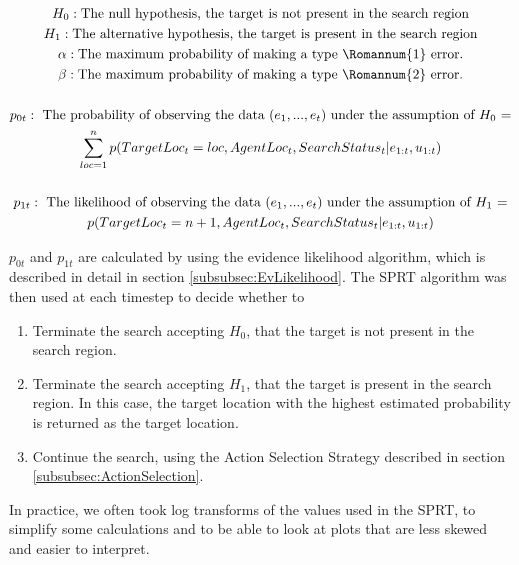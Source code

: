 \begin{gather}\label{eqn:SearchStatus}
H_0 : \text{The null hypothesis, the target is not present in the search region}\nonumber
\\ \nonumber
H_1 : \text{The alternative hypothesis, the target is present in the search region}\nonumber
\\ \nonumber
\alpha : \text{The maximum probability of making a type } \Romannum{1} \text{ error.} \nonumber
\\ \nonumber
\beta : \text{The maximum probability of making a type } \Romannum{2} \text{ error.}\nonumber
\\ \nonumber
\\ \nonumber
p_{0t} : \text{ The probability of observing the data $(e_1, ..., e_t)$ under the assumption of $H_0$ =} \nonumber
\\ \nonumber
\sum_{loc=1}^{n} p(TargetLoc_t = loc, AgentLoc_t, SearchStatus_t| e_{1:t}, u_{1:t})\nonumber
\\ \nonumber
\\ \nonumber
p_{1t} : \text{ The likelihood of observing the data $(e_1, ..., e_t)$ under the assumption of $H_1$ =} \nonumber
\\ \nonumber
p(TargetLoc_t = n+1, AgentLoc_t, SearchStatus_t | e_{1:t}, u_{1:t})\nonumber 
\end{gather}

$p_{0t}$ and $p_{1t}$ are calculated by using the evidence likelihood algorithm, which is described in detail in section \ref{subsubsec:EvLikelihood}. The SPRT algorithm was then used at each timestep to decide whether to 
\begin{enumerate}
    \item Terminate the search accepting $H_0$, that the target is not present in the search region.
    \item Terminate the search accepting $H_1$, that the target is present in the search region. In this case, the target location with the highest estimated probability is returned as the target location.
    \item Continue the search, using the Action Selection Strategy described in section \ref{subsubsec:ActionSelection}.
\end{enumerate}
In practice, we often took log transforms of the values used in the SPRT, to simplify some calculations and to be able to look at plots that are less skewed and easier to interpret.

